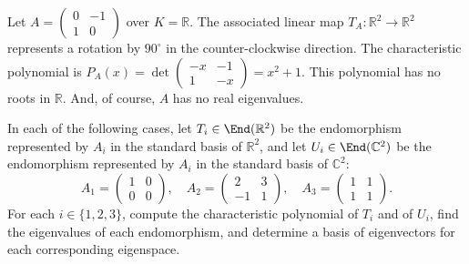 \begin{example}\label{ex:no_real_eigenvalues}
  Let $A = \left(\begin{smallmatrix} 0 & -1 \\ 1 & 0 \end{smallmatrix}\right)$ over $K = \mathbb{R}$. The associated linear map $T_A : \mathbb{R}^2 \rightarrow \mathbb{R}^2$ represents a rotation by $90^\circ$ in the counter-clockwise direction.
  The characteristic polynomial is $P_A(x) = \det\left(\begin{smallmatrix} -x & -1 \\ 1 & -x \end{smallmatrix}\right) = x^2 + 1$.
  This polynomial has no roots in $\mathbb{R}$. And, of course, $A$ has no real eigenvalues.
\end{example}

\begin{exercise}
  \label{exc:eigenvalues_eigenspaces_R_vs_C}
  In each of the following cases, let $T_i \in \End(\mathbb{R}^2)$ be the endomorphism represented by $A_i$ in the standard basis of $\mathbb{R}^2$, and let $U_i \in \End(\mathbb{C}^2)$ be the endomorphism represented by $A_i$ in the standard basis of $\mathbb{C}^2$:
  \[
  A_1 = \begin{pmatrix} 1 & 0 \\ 0 & 0 \end{pmatrix}, \quad
  A_2 = \begin{pmatrix} 2 & 3 \\ -1 & 1 \end{pmatrix}, \quad
  A_3 = \begin{pmatrix} 1 & 1 \\ 1 & 1 \end{pmatrix}.
  \]
  For each $i \in \{1, 2, 3\}$, compute the characteristic polynomial of $T_i$ and of $U_i$, find the eigenvalues of each endomorphism, and determine a basis of eigenvectors for each corresponding eigenspace.
\end{exercise}

